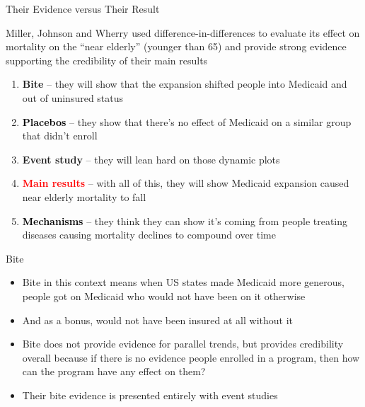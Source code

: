 \documentclass{beamer}
\begin{document}
\begin{frame}{Their Evidence versus Their Result}

Miller, Johnson and Wherry used difference-in-differences to evaluate its effect on mortality on the ``near elderly'' (younger than 65) and provide strong evidence supporting the credibility of their main results

\begin{enumerate}
\item \textbf{Bite} -- they will show that the expansion shifted people into Medicaid and out of uninsured status
\item \textcolor{black}{\textbf{Placebos}} -- they show that there's no effect of Medicaid on a similar group that didn't enroll
\item \textbf{Event study} -- they will lean hard on those dynamic plots
\item \textcolor{red}{\textbf{Main results}} -- with all of this, they will show Medicaid expansion caused near elderly mortality to fall
\item \textcolor{black}{\textbf{Mechanisms}} -- they think they can show it's coming from people treating diseases causing mortality declines to compound over time
\end{enumerate}

\end{frame}

\begin{frame}{Bite}

\begin{itemize}
\item Bite in this context means when US states made Medicaid more generous, people got on Medicaid who would not have been on it otherwise
\item And as a bonus, would not have been insured at all without it
\item Bite does not provide evidence for parallel trends, but provides credibility overall because if there is no evidence people enrolled in a program, then how can the program have any effect on them?
\item Their bite evidence is presented entirely with event studies
\end{itemize}

\end{frame}
\end{document}
